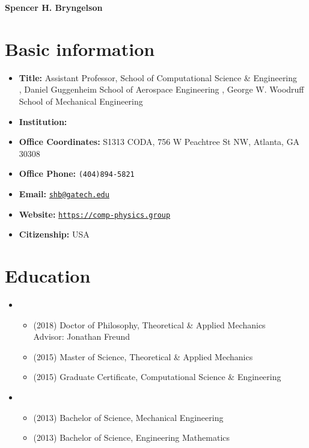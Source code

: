 




\begin{center}
    {\LARGE \bf Spencer H. Bryngelson} 
\end{center}


\section{Basic information}
\begin{itemize}
    \item[] \textbf{Title:} Assistant Professor, School of Computational Science \& Engineering \\
         \APBC, Daniel Guggenheim School of Aerospace Engineering 
         \APBC, George W. Woodruff School of Mechanical Engineering
    \item[] \textbf{Institution:} \GIT
    \item[] \textbf{Office Coordinates:} S1313 CODA, 756 W Peachtree St NW, Atlanta, GA 30308
    \item[] \textbf{Office Phone:} \texttt{(404)894-5821}
    \item[] \textbf{Email:} \href{mailto:shb@gatech.edu}{\texttt{shb@gatech.edu}}
    \item[] \textbf{Website:} \href{https://comp-physics.group}{\texttt{https://comp-physics.group}}
    \item[] \textbf{Citizenship:} USA
\end{itemize}

\section{Education}

\begin{itemize}
    \item \UIUC
    \begin{itemize}
        \item[] (2018) Doctor of Philosophy, Theoretical \& Applied Mechanics \\
            \phantom{(2018)} Advisor: Jonathan Freund
        \item[] (2015) Master of Science, Theoretical \& Applied Mechanics
        \item[] (2015) Graduate Certificate, Computational Science \& Engineering
    \end{itemize}
    \item \UMD
    \begin{itemize}
        \item[] (2013) Bachelor of Science, Mechanical Engineering
        \item[] (2013) Bachelor of Science, Engineering Mathematics
    \end{itemize}
\end{itemize}


